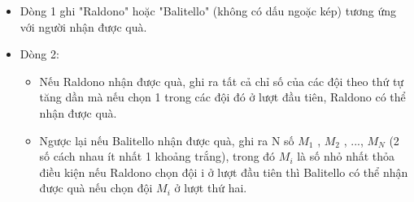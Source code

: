 \begin{itemize}
	\item Dòng 1 ghi "Raldono" hoặc "Balitello" (không có dấu ngoặc kép) tương ứng với người nhận được quà.
	\item Dòng 2:
\begin{itemize}
	\item Nếu Raldono nhận được quà, ghi ra tất cả chỉ số của các đội theo thứ tự tăng dần mà nếu chọn 1 trong các đội đó ở lượt đầu tiên, Raldono có thể nhận được quà.
	\item Ngược lại nếu Balitello nhận được quà, ghi ra N số $M_{1}$ , $M_{2}$ , ..., $M_{N}$ (2 số cách nhau ít nhất 1 khoảng trắng), trong đó $M_{i}$ là số nhỏ nhất thỏa điều kiện nếu Raldono chọn đội i ở lượt đầu tiên thì Balitello có thể nhận được quà nếu chọn đội $M_{i}$ ở lượt thứ hai.
\end{itemize}
\end{itemize}